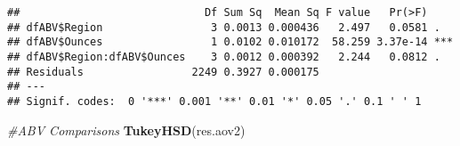 \documentclass[
]{article}
\newenvironment{Shaded}{\begin{snugshade}}{\end{snugshade}}
\newcommand{\CommentTok}[1]{\textcolor[rgb]{0.56,0.35,0.01}{\textit{#1}}}
\newcommand{\KeywordTok}[1]{\textcolor[rgb]{0.13,0.29,0.53}{\textbf{#1}}}
\newcommand{\NormalTok}[1]{#1}
\newcommand{\OperatorTok}[1]{\textcolor[rgb]{0.81,0.36,0.00}{\textbf{#1}}}
\newcommand{\StringTok}[1]{\textcolor[rgb]{0.31,0.60,0.02}{#1}}
\begin{document}
\begin{Shaded}
\end{Shaded}

\begin{verbatim}
##                             Df Sum Sq  Mean Sq F value   Pr(>F)    
## dfABV$Region                 3 0.0013 0.000436   2.497   0.0581 .  
## dfABV$Ounces                 1 0.0102 0.010172  58.259 3.37e-14 ***
## dfABV$Region:dfABV$Ounces    3 0.0012 0.000392   2.244   0.0812 .  
## Residuals                 2249 0.3927 0.000175                     
## ---
## Signif. codes:  0 '***' 0.001 '**' 0.01 '*' 0.05 '.' 0.1 ' ' 1
\end{verbatim}

\begin{Shaded}
\begin{Highlighting}[]
\CommentTok{#ABV Comparisons}
\KeywordTok{TukeyHSD}\NormalTok{(res.aov2)}
\end{Highlighting}
\end{Shaded}
\end{document}
